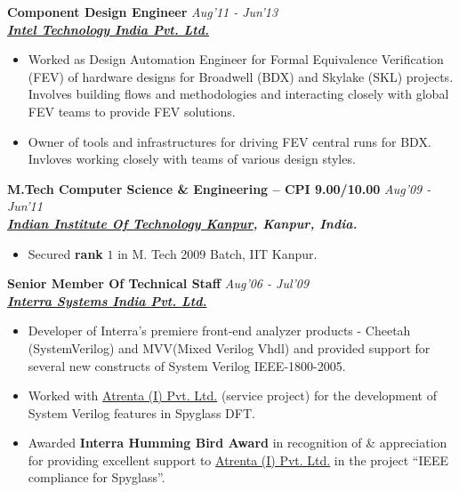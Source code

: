 \documentclass[9pt]{article}
\newenvironment{changemargin}[2]{%
  \begin{list}{}{%
    \setlength{\topsep}{0pt}%
    \setlength{\leftmargin}{#1}%
    \setlength{\rightmargin}{#2}%
    \setlength{\listparindent}{\parindent}%
    \setlength{\itemindent}{\parindent}%
    \setlength{\parsep}{\parskip}%
  }%
  \item[]}{\end{list}
}
\newenvironment{body} {
	\vspace*{-16pt}
	\begin{changemargin}{-0.25in}{-0.5in}
  }	
	{\end{changemargin}
}
\begin{document}
\begin{body}
\begin{itemize}
	\end{itemize}

 \medskip
        \textbf{Component Design Engineer} \hfill \emph{Aug'11 - Jun'13}\\
	\textbf{\emph{\href{http://www.intel.in/content/www/in/en/homepage.html}{Intel Technology India Pvt. Ltd.}}}
	\begin{itemize} \itemsep -0pt
                \item Worked as Design Automation Engineer for Formal Equivalence Verification (FEV) of hardware designs for Broadwell (BDX) and Skylake (SKL) projects. Involves
                building flows and methodologies and interacting closely with
                global FEV teams to provide FEV solutions.
                \item Owner of tools and infrastructures for driving
                FEV central runs for  BDX. Invloves working closely with teams of various
                design styles.
	\end{itemize} 

 \medskip
	\textbf{M.Tech Computer Science \& Engineering -- CPI 9.00/10.00}{} \hfill \emph{Aug'09 - Jun'11}{} \\
	\textbf{\emph{\href{http://www.iitk.ac.in/}{Indian Institute Of Technology Kanpur}, Kanpur, India.}{}} \\
	\begin{itemize} \itemsep -0pt
		\item Secured \textbf{rank} $1$ in M. Tech 2009 Batch, IIT Kanpur.
	\end{itemize}

 \medskip
        \textbf{Senior Member Of Technical Staff} \hfill \emph{Aug'06 - Jul'09}\\
       	\textbf{\emph{\href{http://www.interrasystems.com/}{Interra Systems India Pvt. Ltd.}}}
	\begin{itemize} \itemsep -0pt
		\item Developer of Interra's premiere front-end analyzer products - Cheetah (SystemVerilog) and MVV(Mixed Verilog Vhdl) and 
		provided support for several new constructs of System Verilog IEEE-1800-2005. 
		\item Worked with \href{http://www.atrenta.com/}{Atrenta (I) Pvt. Ltd.} (service project) for the development of System Verilog features in Spyglass DFT.
		\item Awarded \textbf{Interra Humming Bird Award} in recognition of \& appreciation for providing excellent support to \href{}{Atrenta (I) Pvt. Ltd.} in the project ``IEEE compliance for Spyglass''.
	\end{itemize}


\end{body}
\end{document}
